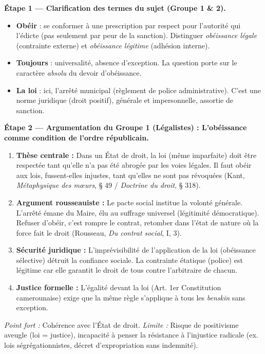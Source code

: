 \documentclass[11pt]{article}
\newcommand{\cle}[1]{{\popxbold\color{popdark}#1}}
\newcounter{popsec}
\newcounter{popsub}
\newcommand{\courssub}[1]{%
  \stepcounter{popsub}%
  \par\vspace{9pt}\noindent{\popxbold\fontsize{11.5}{13}\selectfont\color{popink}{\color{poporange}\thepopsec.\thepopsub}\hspace{6pt}#1}\par\nopagebreak\vspace{4pt}
}
\begin{document}
\courssub{Démarche et corrigé commenté}
\begin{exoresolu}
\textbf{Étape 1 — Clarification des termes du sujet (Groupe 1 \& 2).}
\begin{itemize}
    \item \textbf{Obéir} : se conformer à une prescription par respect pour l'autorité qui l'édicte (pas seulement par peur de la sanction). Distinguer \emph{obéissance légale} (contrainte externe) et \emph{obéissance légitime} (adhésion interne).
    \item \textbf{Toujours} : universalité, absence d'exception. La question porte sur le caractère \emph{absolu} du devoir d'obéissance.
    \item \textbf{La loi} : ici, l'arrêté municipal (règlement de police administrative). C'est une norme \cle{juridique} (droit positif), \cle{générale} et \cle{impersonnelle}, assortie de \cle{sanction}.
\end{itemize}

\textbf{Étape 2 — Argumentation du Groupe 1 (Légalistes) : L'obéissance comme condition de l'ordre républicain.}
\begin{enumerate}
    \item \textbf{Thèse centrale :} Dans un État de droit, la loi (même imparfaite) doit être respectée tant qu'elle n'a pas été abrogée par les voies légales. \guillemotleft Il faut obéir aux lois, fussent-elles injustes, tant qu'elles ne sont pas révoquées \guillemotright (Kant, \emph{Métaphysique des mœurs}, § 49 / \emph{Doctrine du droit}, § 318).
    \item \textbf{Argument rousseauiste :} Le pacte social institue la \cle{volonté générale}. L'arrêté émane du Maire, élu au suffrage universel (légitimité démocratique). Refuser d'obéir, c'est rompre le contrat, retomber dans l'état de nature où \guillemotleft la force fait le droit \guillemotright (Rousseau, \emph{Du contrat social}, I, 3).
    \item \textbf{Sécurité juridique :} L'imprévisibilité de l'application de la loi (obéissance sélective) détruit la confiance sociale. La \cle{contrainte} étatique (police) est légitime car elle garantit le droit de tous contre l'arbitraire de chacun.
    \item \textbf{Justice formelle :} L'égalité devant la loi (Art. 1er Constitution camerounaise) exige que la même règle s'applique à tous les \emph{benskin} sans exception.
\end{enumerate}
\emph{Point fort :} Cohérence avec l'État de droit. \emph{Limite :} Risque de \cle{positivisme aveugle} (loi = justice), incapacité à penser la résistance à l'injustice radicale (ex. lois ségrégationnistes, décret d'expropriation sans indemnité).


\end{exoresolu}
\end{document}
